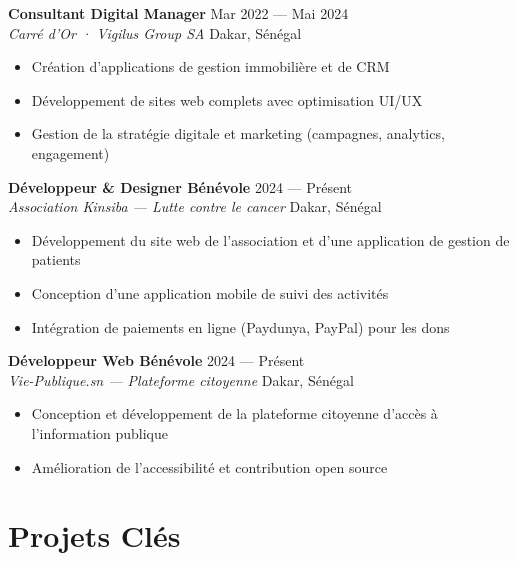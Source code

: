 \documentclass[a4paper,11pt]{article}
\newcommand{\cventry}[4]{
    {\textbf{\color{darktext}#1}} \hfill {\small\color{graytext}#2} \\
    {\color{accent}\textit{#3}} \hfill {\small\color{graytext}#4}
}
\begin{document}
\vspace{4pt}

\cventry{Consultant Digital Manager}{Mar 2022 — Mai 2024}{Carré d'Or · Vigilus Group SA}{Dakar, Sénégal}
\begin{itemize}[leftmargin=12pt, itemsep=1pt, topsep=3pt]
    \item Création d'applications de gestion immobilière et de CRM
    \item Développement de sites web complets avec optimisation UI/UX
    \item Gestion de la stratégie digitale et marketing (campagnes, analytics, engagement)
\end{itemize}

\vspace{4pt}

\cventry{Développeur \& Designer Bénévole}{2024 — Présent}{Association Kinsiba — Lutte contre le cancer}{Dakar, Sénégal}
\begin{itemize}[leftmargin=12pt, itemsep=1pt, topsep=3pt]
    \item Développement du site web de l'association et d'une application de gestion de patients
    \item Conception d'une application mobile de suivi des activités
    \item Intégration de paiements en ligne (Paydunya, PayPal) pour les dons
\end{itemize}

\vspace{4pt}

\cventry{Développeur Web Bénévole}{2024 — Présent}{Vie-Publique.sn — Plateforme citoyenne}{Dakar, Sénégal}
\begin{itemize}[leftmargin=12pt, itemsep=1pt, topsep=3pt]
    \item Conception et développement de la plateforme citoyenne d'accès à l'information publique
    \item Amélioration de l'accessibilité et contribution open source
\end{itemize}

\section{ Projets Clés}
\end{document}
